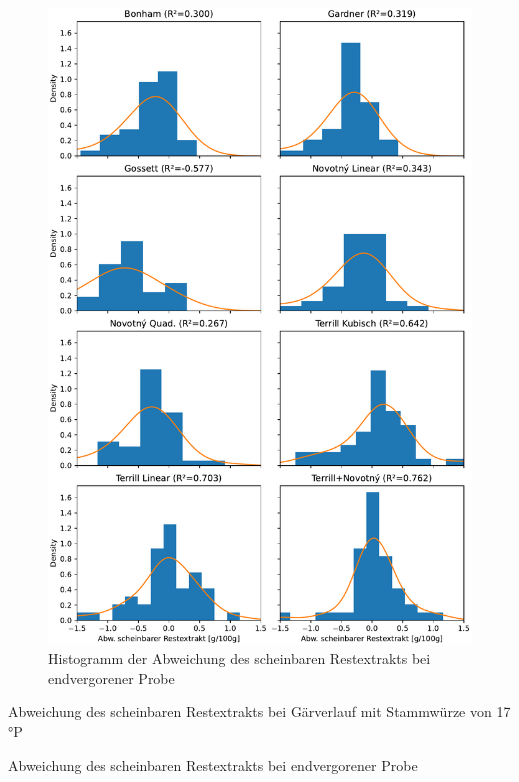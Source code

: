 \documentclass[a4paper,parskip=half]{scrartcl}
\begin{document}
\begin{figure}[H]
\centering
\includegraphics[width=14cm]{graph_ae.pdf}
\caption{Histogramm der Abweichung des scheinbaren Restextrakts bei endvergorener Probe}
\label{fig:hbfgraph}
\end{figure}


\begin{table}[h]
\centering

\caption{Abweichung des scheinbaren Restextrakts bei Gärverlauf mit Stammwürze von 17 °P}
\label{table:novotnytable}
\end{table}

\begin{table}[h]
\centering

\caption{Abweichung des scheinbaren Restextrakts bei endvergorener Probe}
\label{table:hbftable}
\end{table}
\end{document}
